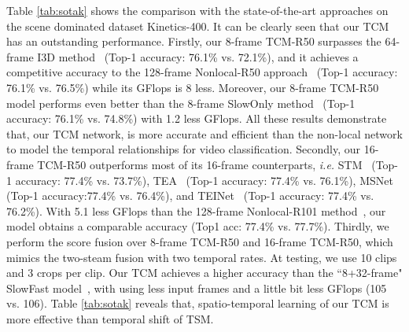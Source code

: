 \documentclass[journal]{IEEEtran}
\begin{document}
Table \ref{tab:sotak} shows the comparison with the state-of-the-art approaches on the scene dominated dataset Kinetics-400. It can be clearly seen that our TCM has an outstanding performance. Firstly, our 8-frame TCM-R50 surpasses the 64-frame I3D method~\cite{carreira2017quo} (Top-1 accuracy: 76.1\% vs. 72.1\%), and it achieves a competitive accuracy to the 128-frame Nonlocal-R50 approach~\cite{NonLocal2018} (Top-1 accuracy: 76.1\% vs. 76.5\%) while its GFlops is 8 less. Moreover, our 8-frame TCM-R50 model performs even better than the 8-frame SlowOnly method~\cite{feichtenhofer2019slowfast} (Top-1 accuracy: 76.1\% vs. 74.8\%) with 1.2 less GFlops. All these results demonstrate that, our TCM network, is more accurate and efficient than the non-local network to model the temporal relationships for video classification. Secondly, our 16-frame TCM-R50 outperforms most of its 16-frame counterparts, \textit{i.e.} STM~\cite{jiang2019stm} (Top-1 accuracy: 77.4\% vs. 73.7\%), TEA~\cite{li2020tea} (Top-1 accuracy: 77.4\% vs. 76.1\%), MSNet~\cite{kwon2020motionsqueeze} (Top-1 accuracy:77.4\% vs. 76.4\%), and TEINet~\cite{liu2020teinet} (Top-1 accuracy: 77.4\% vs. 76.2\%). With 5.1 less GFlops than the 128-frame Nonlocal-R101 method~\cite{NonLocal2018}, our model obtains a comparable accuracy (Top1 acc: 77.4\% vs. 77.7\%). Thirdly, we perform the score fusion over 8-frame TCM-R50 and 16-frame TCM-R50, which mimics the two-steam fusion with two temporal rates. At testing, we use 10 clips and 3 crops per clip. Our TCM achieves a higher accuracy than the ``8+32-frame" SlowFast model~\cite{feichtenhofer2019slowfast}, with using less input frames and a little bit less GFlops (105 vs. 106). Table \ref{tab:sotak} reveals that, spatio-temporal learning of our TCM is more effective than temporal shift of TSM.
\end{document}
